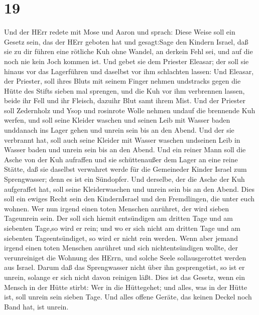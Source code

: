 \hypertarget{section-18}{%
\section{19}\label{section-18}}

 Und der HErr redete mit Mose und Aaron und sprach:
 Diese Weise soll ein Gesetz sein, das der HErr geboten hat
und gesagt:Sage den Kindern Israel, daß sie zu dir führen eine rötliche
Kuh ohne Wandel, an derkein Fehl sei, und auf die noch nie kein Joch
kommen ist.  Und gebet sie dem Priester Eleasar; der soll
sie hinaus vor das Lagerführen und daselbst vor ihm schlachten lassen:
 Und Eleasar, der Priester, soll ihres Bluts mit seinem
Finger nehmen undstracks gegen die Hütte des Stifts sieben mal sprengen,
 und die Kuh vor ihm verbrennen lassen, beide ihr Fell und
ihr Fleisch, dazuihr Blut samt ihrem Mist.  Und der Priester
soll Zedernholz und Ysop und rosinrote Wolle nehmen undauf die brennende
Kuh werfen,  und soll seine Kleider waschen und seinen Leib
mit Wasser baden unddanach ins Lager gehen und unrein sein bis an den
Abend.  Und der sie verbrannt hat, soll auch seine Kleider
mit Wasser waschen undseinen Leib in Wasser baden und unrein sein bis an
den Abend.  Und ein reiner Mann soll die Asche von der Kuh
aufraffen und sie schüttenaußer dem Lager an eine reine Stätte, daß sie
daselbst verwahret werde für die Gemeineder Kinder Israel zum
Sprengwasser; denn es ist ein Sündopfer.  Und derselbe, der
die Asche der Kuh aufgeraffet hat, soll seine Kleiderwaschen und unrein
sein bis an den Abend. Dies soll ein ewiges Recht sein den KindernIsrael
und den Fremdlingen, die unter euch wohnen.  Wer nun irgend
einen toten Menschen anrühret, der wird sieben Tageunrein sein.
 Der soll sich hiemit entsündigen am dritten Tage und am
siebenten Tage,so wird er rein; und wo er sich nicht am dritten Tage und
am siebenten Tageentsündiget, so wird er nicht rein werden.
 Wenn aber jemand irgend einen toten Menschen anrühret und
sich nichtentsündigen wollte, der verunreiniget die Wohnung des HErrn,
und solche Seele sollausgerottet werden aus Israel. Darum daß das
Sprengwasser nicht über ihn gesprengetist, so ist er unrein, solange er
sich nicht davon reinigen läßt.  Dies ist das Gesetz, wenn
ein Mensch in der Hütte stirbt: Wer in die Hüttegehet; und alles, was in
der Hütte ist, soll unrein sein sieben Tage.  Und alles
offene Geräte, das keinen Deckel noch Band hat, ist unrein.
